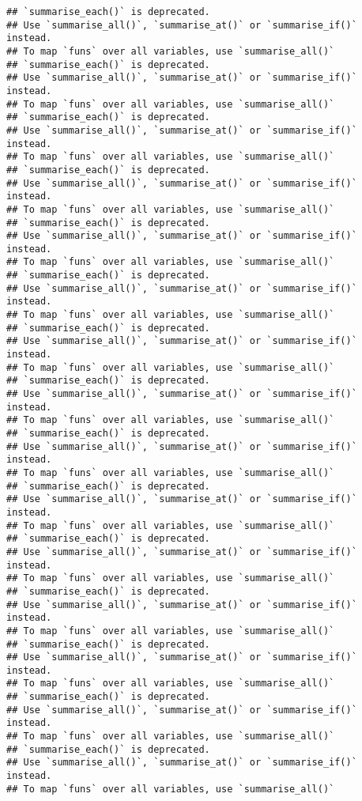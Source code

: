 \documentclass[]{article}
\begin{document}
\begin{verbatim}
## `summarise_each()` is deprecated.
## Use `summarise_all()`, `summarise_at()` or `summarise_if()` instead.
## To map `funs` over all variables, use `summarise_all()`
## `summarise_each()` is deprecated.
## Use `summarise_all()`, `summarise_at()` or `summarise_if()` instead.
## To map `funs` over all variables, use `summarise_all()`
## `summarise_each()` is deprecated.
## Use `summarise_all()`, `summarise_at()` or `summarise_if()` instead.
## To map `funs` over all variables, use `summarise_all()`
## `summarise_each()` is deprecated.
## Use `summarise_all()`, `summarise_at()` or `summarise_if()` instead.
## To map `funs` over all variables, use `summarise_all()`
## `summarise_each()` is deprecated.
## Use `summarise_all()`, `summarise_at()` or `summarise_if()` instead.
## To map `funs` over all variables, use `summarise_all()`
## `summarise_each()` is deprecated.
## Use `summarise_all()`, `summarise_at()` or `summarise_if()` instead.
## To map `funs` over all variables, use `summarise_all()`
## `summarise_each()` is deprecated.
## Use `summarise_all()`, `summarise_at()` or `summarise_if()` instead.
## To map `funs` over all variables, use `summarise_all()`
## `summarise_each()` is deprecated.
## Use `summarise_all()`, `summarise_at()` or `summarise_if()` instead.
## To map `funs` over all variables, use `summarise_all()`
## `summarise_each()` is deprecated.
## Use `summarise_all()`, `summarise_at()` or `summarise_if()` instead.
## To map `funs` over all variables, use `summarise_all()`
## `summarise_each()` is deprecated.
## Use `summarise_all()`, `summarise_at()` or `summarise_if()` instead.
## To map `funs` over all variables, use `summarise_all()`
## `summarise_each()` is deprecated.
## Use `summarise_all()`, `summarise_at()` or `summarise_if()` instead.
## To map `funs` over all variables, use `summarise_all()`
## `summarise_each()` is deprecated.
## Use `summarise_all()`, `summarise_at()` or `summarise_if()` instead.
## To map `funs` over all variables, use `summarise_all()`
## `summarise_each()` is deprecated.
## Use `summarise_all()`, `summarise_at()` or `summarise_if()` instead.
## To map `funs` over all variables, use `summarise_all()`
## `summarise_each()` is deprecated.
## Use `summarise_all()`, `summarise_at()` or `summarise_if()` instead.
## To map `funs` over all variables, use `summarise_all()`
## `summarise_each()` is deprecated.
## Use `summarise_all()`, `summarise_at()` or `summarise_if()` instead.
## To map `funs` over all variables, use `summarise_all()`
\end{verbatim}
\end{document}
